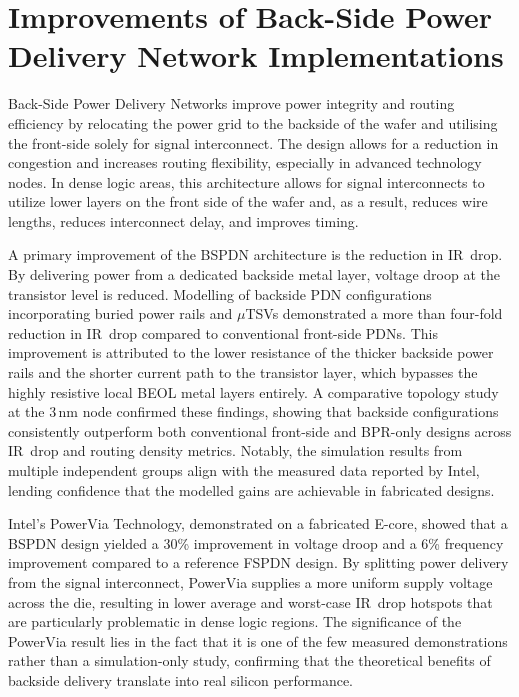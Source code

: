 \section{Improvements of Back-Side Power Delivery Network Implementations}

Back-Side Power Delivery Networks improve power integrity and routing efficiency by relocating the power grid to the backside of the wafer and utilising the front-side solely for signal interconnect. The design allows for a reduction in congestion and increases routing flexibility, especially in advanced technology nodes\cite{10631463}. In dense logic areas, this architecture allows for signal interconnects to utilize lower layers on the front side of the wafer and, as a result, reduces wire lengths, reduces interconnect delay, and improves timing\cite{11192533}.

A primary improvement of the BSPDN architecture is the reduction in IR~drop. By delivering power from a dedicated backside metal layer, voltage droop at the transistor level is reduced. Modelling of backside PDN configurations incorporating buried power rails and $\mu$TSVs demonstrated a more than four-fold reduction in IR~drop compared to conventional front-side PDNs\cite{8932458}. This improvement is attributed to the lower resistance of the thicker backside power rails and the shorter current path to the transistor layer, which bypasses the highly resistive local BEOL metal layers entirely. A comparative topology study at the 3\,nm node confirmed these findings, showing that backside configurations consistently outperform both conventional front-side and BPR-only designs across IR~drop and routing density metrics\cite{10244504}. Notably, the simulation results from multiple independent groups align with the measured data reported by Intel, lending confidence that the modelled gains are achievable in fabricated designs.

Intel's PowerVia Technology, demonstrated on a fabricated E-core, showed that a BSPDN design yielded a 30\% improvement in voltage droop and a 6\% frequency improvement compared to a reference FSPDN design\cite{10185208}. By splitting power delivery from the signal interconnect, PowerVia supplies a more uniform supply voltage across the die, resulting in lower average and worst-case IR~drop hotspots that are particularly problematic in dense logic regions\cite{10185208}. The significance of the PowerVia result lies in the fact that it is one of the few measured demonstrations rather than a simulation-only study, confirming that the theoretical benefits of backside delivery translate into real silicon performance.

